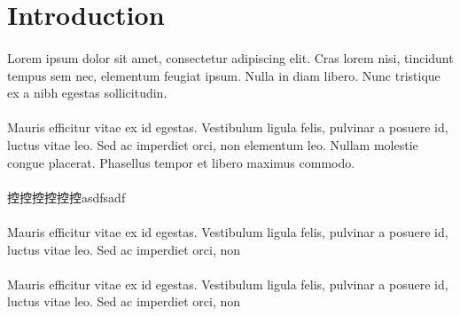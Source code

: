 \documentclass{article}
\author{Shawn Dennis Lin}
\date{\today}
\title{}
\begin{document}
\tableofcontents


\section{Introduction}
\label{sec:org6eb9443}

\paragraph{}
Lorem ipsum dolor sit amet, consectetur adipiscing elit. Cras lorem
nisi, tincidunt tempus sem nec, elementum feugiat ipsum. Nulla in
diam libero. Nunc tristique ex a nibh egestas sollicitudin.

\paragraph{}
Mauris efficitur vitae ex id egestas. Vestibulum ligula felis,
pulvinar a posuere id, luctus vitae leo. Sed ac imperdiet orci, non
elementum leo. Nullam molestie congue placerat. Phasellus tempor et
libero maximus commodo.

\paragraph{}
控控控控控控asdfsadf

\paragraph{}
Mauris efficitur vitae ex id egestas. Vestibulum ligula felis,
pulvinar a posuere id, luctus vitae leo. Sed ac imperdiet orci, non

\paragraph{}
Mauris efficitur vitae ex id egestas. Vestibulum ligula felis,
pulvinar a posuere id, luctus vitae leo. Sed ac imperdiet orci, non
\end{document}
